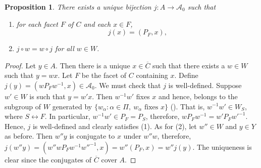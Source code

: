 \documentclass{article}
\theoremstyle{thmstyle}
\newtheorem{proposition}[theorem]{Proposition}
\theoremstyle{defstyle}
\newcommand{\scrA}{\mathscr{A}}
\begin{document}
\begin{proposition}
    There exists a \emph{unique} bijection $j: A\to\scrA_0$ such that 
    \begin{enumerate}[label=(\arabic*)]
        \item for each facet $F$ of $C$ and each $x\in F$, 
        \begin{equation*}
            j(x) = (P_F, x),
        \end{equation*}
        \item $j\circ w = w\circ j$ for all $w\in W$.
    \end{enumerate}
\end{proposition}
\begin{proof}
    Let $y\in A$. Then there is a unique $x\in\overline C$ such that there exists a $w\in W$ such that $y = wx$. Let $F$ be the facet of $C$ containing $x$. Define $j(y) = (wP_Fw^{-1}, x)\in\scrA_0$. We must check that $j$ is well-defined. Suppose $w'\in W$ is such that $y = w'x$. Then $w^{-1}w'$ fixes $x$ and hence, belongs to the subgroup of $W$ generated by $\{w_\alpha\colon\alpha\in\Pi,~w_\alpha\text{ fixes }x\}$ (\cite[last line on pg. 16]{macdonald-spherical-functions}). That is, $w^{-1}w'\in W_S$, where $S\longleftrightarrow F$. In particular, $w^{-1}w'\in P_F = P_S$, therefore, $wP_Fw^{-1} = w'P_Fw'^{-1}$. Hence, $j$ is well-defined and clearly satisfies (1). As for (2), let $w''\in W$ and $y\in Y$ as before. Then $w''y$ is conjugate to $x$ under $w''w$, therefore, $j(w''y) = \left(w''wP_Fw^{-1}w''^{-1}, x\right) = w''\left(P_F, x\right) = w''j(y)$. The uniqueness is clear since the conjugates of $\overline C$ cover $A$.
\end{proof} 
\end{document}
